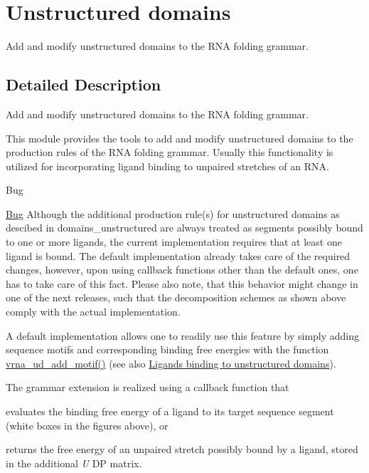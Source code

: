 \hypertarget{group__domains__up}{}\section{Unstructured domains}
\label{group__domains__up}


Add and modify unstructured domains to the R\+NA folding grammar.  




\subsection{Detailed Description}
Add and modify unstructured domains to the R\+NA folding grammar. 

This module provides the tools to add and modify unstructured domains to the production rules of the R\+NA folding grammar. Usually this functionality is utilized for incorporating ligand binding to unpaired stretches of an R\+NA.

\begin{DoxyRefDesc}{Bug}
\item[\hyperlink{bug__bug000002}{Bug}]Although the additional production rule(s) for unstructured domains as descibed in domains\+\_\+unstructured are always treated as \textquotesingle{}segments possibly bound to one or more ligands\textquotesingle{}, the current implementation requires that at least one ligand is bound. The default implementation already takes care of the required changes, however, upon using callback functions other than the default ones, one has to take care of this fact. Please also note, that this behavior might change in one of the next releases, such that the decomposition schemes as shown above comply with the actual implementation.\end{DoxyRefDesc}


A default implementation allows one to readily use this feature by simply adding sequence motifs and corresponding binding free energies with the function \hyperlink{group__domains__up_gaec0c3313fb2951946614f920d289829a}{vrna\+\_\+ud\+\_\+add\+\_\+motif()} (see also \hyperlink{group__ligands__up}{Ligands binding to unstructured domains}).

The grammar extension is realized using a callback function that
\begin{DoxyItemize}
\item evaluates the binding free energy of a ligand to its target sequence segment (white boxes in the figures above), or
\item returns the free energy of an unpaired stretch possibly bound by a ligand, stored in the additional {\itshape U} DP matrix.
\end{DoxyItemize}

